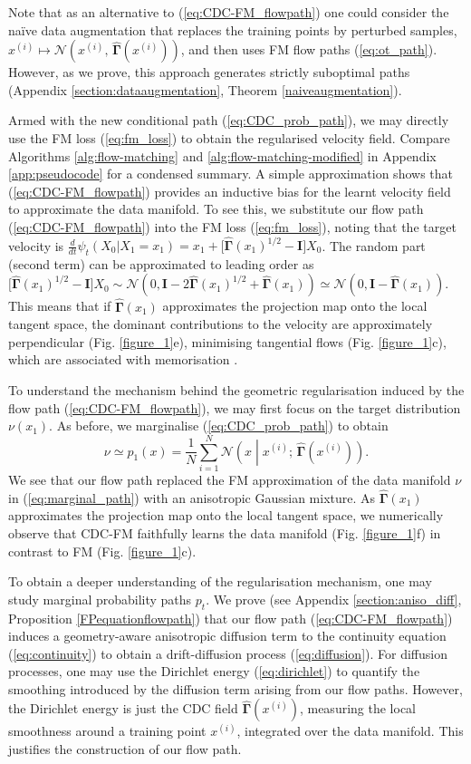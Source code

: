 \documentclass{article} %
\newcommand{\N}{\mathcal{N}}
\newcommand{\I}{\mathbf{I}}
\newcommand{\G}{\widehat{\mathbf{\Gamma}}}
\begin{document}
Note that as an alternative to (\ref{eq:CDC-FM_flowpath}) one could consider the naïve data augmentation that replaces the training points by perturbed samples, $x^{(i)}\mapsto \N(x^{(i)},\,\G(x^{(i)}))$, and then uses FM flow paths (\ref{eq:ot_path}). 
However, as we prove, this approach generates strictly suboptimal paths (Appendix \ref{section:dataaugmentation}, Theorem \ref{naiveaugmentation}). 

Armed with the new conditional path (\ref{eq:CDC_prob_path}), we may directly use the FM loss (\ref{eq:fm_loss}) to obtain the regularised velocity field. Compare Algorithms \ref{alg:flow-matching} and \ref{alg:flow-matching-modified} in Appendix \ref{app:pseudocode} for a condensed summary. A simple approximation shows that (\ref{eq:CDC-FM_flowpath}) provides an inductive bias for the learnt velocity field to approximate the data manifold.
To see this, we substitute our flow path (\ref{eq:CDC-FM_flowpath}) into the FM loss (\ref{eq:fm_loss}), noting that the target velocity is $\tfrac{d}{dt}\psi_t(X_0|X_1=x_1) = x_1 + \big[  \G(x_1)^{1/2} - \I\big] X_0$.
The random part (second term) can be approximated to leading order as $\big[  \G(x_1)^{1/2} - \I\big] X_0\sim \N(0, \I - 2\G(x_1)^{1/2} + \G(x_1))
\simeq \N(0, \I - \G(x_1))$.
This means that if $\G(x_1)$ approximates the projection map onto the local tangent space, the dominant contributions to the velocity are approximately perpendicular (Fig. \ref{figure_1}e), minimising tangential flows (Fig. \ref{figure_1}c), which are associated with memorisation \citep{achilli_losing_2024}.

To understand the mechanism behind the geometric regularisation induced by the flow path (\ref{eq:CDC-FM_flowpath}), we may first focus on the target distribution $\nu(x_1)$. As before, we marginalise (\ref{eq:CDC_prob_path}) to obtain
%
\begin{equation}\label{eq:CDCapprox}
\nu\simeq p_1(x)=\frac1N\sum_{i=1}^N \N\left(x\middle|x^{(i)};\,\G(x^{(i)})\right).
\end{equation}
%
We see that our flow path replaced the FM approximation of the data manifold $\nu$ in (\ref{eq:marginal_path}) with an anisotropic Gaussian mixture. 
As $\G(x_1)$ approximates the projection map onto the local tangent space, we numerically observe that CDC-FM faithfully learns the data manifold (Fig. \ref{figure_1}f) in contrast to FM (Fig. \ref{figure_1}c). 

To obtain a deeper understanding of the regularisation mechanism, one may study marginal probability paths $p_t$. We prove (see Appendix \ref{section:aniso_diff}, Proposition \ref{FPequationflowpath}) that our flow path (\ref{eq:CDC-FM_flowpath}) induces a geometry-aware anisotropic diffusion term to the continuity equation (\ref{eq:continuity}) to obtain a drift-diffusion process (\ref{eq:diffusion}).
For diffusion processes, one may use the Dirichlet energy (\ref{eq:dirichlet}) to quantify the smoothing introduced by the diffusion term arising from our flow paths. 
However, the Dirichlet energy is just the CDC field $\G(x^{(i)})$, measuring the local smoothness around a training point $x^{(i)}$, integrated over the data manifold. This justifies the construction of our flow path.
\end{document}
